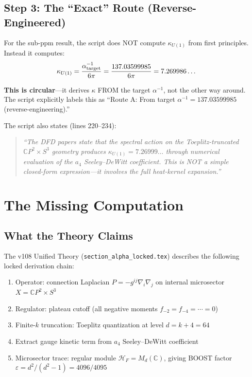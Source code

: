 \documentclass[11pt]{article}
\begin{document}
\subsection{Step 3: The ``Exact'' Route (Reverse-Engineered)}

For the sub-ppm result, the script does NOT compute $\kappa_{U(1)}$
from first principles. Instead it computes:
\begin{equation}
\kappa_{U(1)} = \frac{\alpha^{-1}_{\rm target}}{6\pi}
= \frac{137.03599985}{6\pi} = 7.269986\ldots
\end{equation}

\textbf{This is circular}---it derives $\kappa$ FROM the target $\alpha^{-1}$,
not the other way around. The script explicitly labels this as
``Route A: From target $\alpha^{-1} = 137.03599985$ (reverse-engineering).''

The script also states (lines 220--234):
\begin{quote}
\textit{``The DFD papers state that the spectral action on the
Toeplitz-truncated $\mathbb{C}P^2 \times S^3$ geometry produces
$\kappa_{U(1)} = 7.26999\ldots$ through numerical evaluation of the
$a_4$ Seeley--DeWitt coefficient. This is NOT a simple closed-form
expression---it involves the full heat-kernel expansion.''}
\end{quote}

\section{The Missing Computation}

\subsection{What the Theory Claims}

The v108 Unified Theory (\texttt{section\_alpha\_locked.tex}) describes
the following locked derivation chain:
\begin{enumerate}
\item Operator: connection Laplacian $P = -g^{ij}\nabla_i\nabla_j$ on
  internal microsector $X = \mathbb{C}P^2 \times S^3$
\item Regulator: plateau cutoff (all negative moments $f_{-2} = f_{-4} = \cdots = 0$)
\item Finite-$k$ truncation: Toeplitz quantization at level $d = k+4 = 64$
\item Extract gauge kinetic term from $a_4$ Seeley--DeWitt coefficient
\item Microsector trace: regular module $\mathcal{H}_F = M_d(\mathbb{C})$,
  giving BOOST factor $\varepsilon = d^2/(d^2-1) = 4096/4095$
\end{enumerate}
\end{document}
